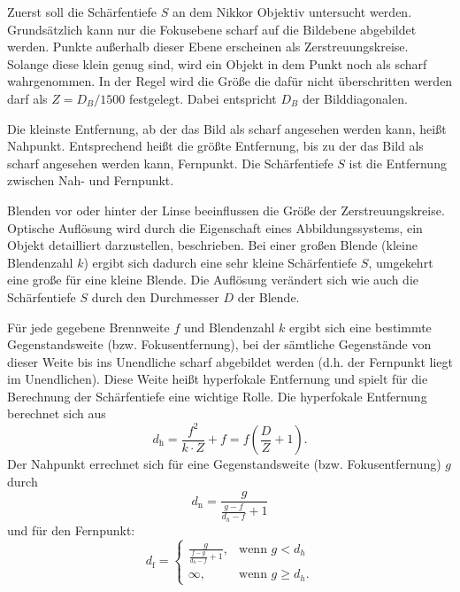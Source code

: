 		Zuerst soll die Schärfentiefe $S$ an dem Nikkor Objektiv untersucht werden. 	
		Grundsätzlich kann nur die Fokusebene scharf auf die Bildebene abgebildet werden. 
		Punkte außerhalb dieser Ebene erscheinen als Zerstreuungskreise. 
		Solange diese klein genug sind, wird ein Objekt in dem Punkt noch als scharf wahrgenommen.
		In der Regel wird die Größe die dafür nicht überschritten werden darf als $Z = D_B/1500$ festgelegt.
		Dabei entspricht $D_B$ der Bilddiagonalen.
		
		Die kleinste Entfernung, ab der das Bild als scharf angesehen werden kann, heißt Nahpunkt. Entsprechend heißt die größte Entfernung, bis zu der das Bild als scharf angesehen werden kann, Fernpunkt. Die Schärfentiefe $S$ ist die Entfernung zwischen Nah- und Fernpunkt.
		
		Blenden vor oder hinter der Linse beeinflussen die Größe der Zerstreuungskreise. 
		Optische Auflösung wird durch die Eigenschaft eines Abbildungssystems, ein Objekt detailliert darzustellen, beschrieben. 
		Bei einer großen Blende (kleine Blendenzahl $k$) ergibt sich dadurch eine sehr kleine Schärfentiefe $S$, umgekehrt eine große für eine kleine Blende. 
		Die Auflösung verändert sich wie auch die Schärfentiefe $S$ durch den Durchmesser $D$ der Blende.
		
		Für jede gegebene Brennweite $f$ und Blendenzahl $k$ ergibt sich eine bestimmte Gegenstandsweite (bzw. Fokusentfernung), bei der sämtliche Gegenstände von dieser Weite bis ins Unendliche scharf abgebildet werden (d.h. der Fernpunkt liegt im Unendlichen). Diese Weite heißt hyperfokale Entfernung und spielt für die Berechnung der Schärfentiefe eine wichtige Rolle.
		Die hyperfokale Entfernung berechnet sich aus
		\begin{equation} \label{eq:hyperfokal}
			d_\text{h} = \frac{f^2}{k\cdot Z} + f = f \left( \frac{D}{Z}+1\right) .
		\end{equation}
		Der Nahpunkt errechnet sich für eine Gegenstandsweite (bzw. Fokusentfernung) $g$ durch
		\begin{equation} \label{eq:nah}
			d_\text{n} = \frac{g}{\frac{g-f}{d_h-f}+1}
		\end{equation} 
		und für den Fernpunkt:
		\begin{equation} \label{eq:fern}
			d_\text{f} = 
			\begin{cases}
				\frac{g}{\frac{f-g}{d_h-f}+1}, & \text{wenn } g < d_h \\
				\infty, & \text{wenn } g \geq d_h .
			\end{cases}
		\end{equation}
		
